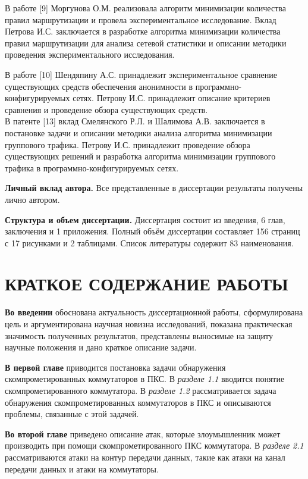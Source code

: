\documentclass[14pt,autoref,href]{disser}
\theoremstyle{definition}
\begin{document}
В работе [9] Моргунова О.М. реализовала алгоритм минимизации количества правил маршрутизации и провела экспериментальное исследование.
Вклад Петрова И.С. заключается в разработке алгоритма минимизации количества правил маршрутизации для анализа сетевой статистики и описании методики проведения экспериментального исследования.

В работе [10] Шендяпину А.С. принадлежит экспериментальное сравнение существующих средств обеспечения анонимности в программно-конфигурируемых сетях.
Петрову И.С. принадлежит описание критериев сравнения и проведение обзора существующих средств.
\\

В патенте [13] вклад Смелянского Р.Л. и Шалимова А.В. заключается в постановке задачи и описании методики анализа алгоритма минимизации группового трафика.
Петрову И.С. принадлежит проведение обзора существующих решений и разработка алгоритма минимизации группового трафика в программно-конфигурируемых сетях.

\textbf{Личный вклад автора.} Все представленные в диссертации результаты получены лично автором.

\textbf{Структура и объем диссертации.} Диссертация состоит из введения, 6 глав, заключения и 1 приложения.
Полный объём диссертации составляет 156 страниц с 17 рисунками и 2 таблицами.
Список литературы содержит 83 наименования.

\section*{КРАТКОЕ СОДЕРЖАНИЕ РАБОТЫ}

\textbf{Во введении} обоснована актуальность диссертационной работы, сформулирована цель и аргументирована научная новизна исследований, показана практическая значимость полученных результатов, представлены выносимые на защиту научные положения и дано краткое описание задачи.

\textbf{В первой главе} приводится постановка задачи обнаружения скомпрометированных коммутаторов в ПКС.
В \emph{разделе 1.1} вводится понятие скомпрометированного коммутатора. В \emph{разделе 1.2} рассматривается задача обнаружения скомпрометированных коммутаторов в ПКС и описываются проблемы, связанные с этой задачей.

\textbf{Во второй главе} приведено описание атак, которые злоумышленник может производить при помощи скомпрометированного ПКС коммутатора.
В \emph{разделе 2.1} рассматриваются атаки на контур передачи данных, такие как атаки на канал передачи данных и атаки на коммутаторы.
\\
\end{document}
